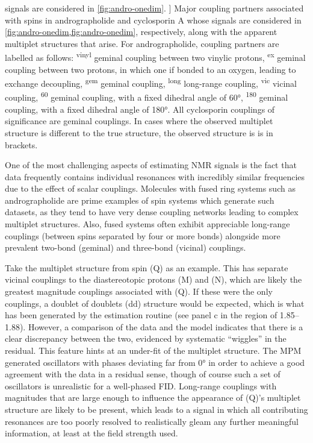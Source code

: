 \begin{table}
    signals are considered in \cref{fig:andro-onedim}.
]{
    Major coupling partners associated with spins in andrographolide and
    cyclosporin A whose
    signals are considered in \cref{fig:andro-onedim,fig:andro-onedim},
    respectively, along with the
    apparent multiplet structures that arise.
    For andrographolide,
    coupling partners are labelled as follows:
    \textsuperscript{vinyl} geminal coupling between two vinylic protons,
    \textsuperscript{ex} geminal coupling between two protons, in which one
    if bonded to an oxygen, leading to exchange decoupling,
    \textsuperscript{gem} geminal coupling,
    \textsuperscript{long} long-range coupling,
    \textsuperscript{vic} vicinal coupling,
    \textsuperscript{60} geminal coupling, with a fixed dihedral angle of \ang{60},
    \textsuperscript{180} geminal coupling, with a fixed dihedral angle of \ang{180}.
    All cyclosporin couplings of significance are geminal couplings.
    In cases where the observed multiplet structure is different to the true
    structure, the observed structure is is in brackets.
}
\label{tab:andro-multiplets}
\end{table}
One of the most challenging aspects of estimating \ac{NMR} signals is
the fact that data frequently contains individual resonances with incredibly
similar frequencies due to the effect of scalar couplings. Molecules
with fused ring systems such as andrographolide are prime examples of spin
systems which generate such datasets, as they tend to have very dense coupling
networks leading to complex multiplet structures. Also, fused systems often
exhibit appreciable long-range couplings (between spins separated by four or more bonds) alongside more prevalent two-bond (geminal) and three-bond (vicinal) couplings.

Take the multiplet structure from spin (Q) as an example.
This has separate vicinal couplings to the
diastereotopic protons (M) and (N), which are likely the greatest magnitude couplings
associated with (Q). If these were the only couplings, a doublet of doublets
(dd) structure would be expected, which is what has been generated by
the estimation routine (see panel c in the region of
\SIrange{1.85}{1.88}{\partspermillion}). However, a comparison of the data and
the model indicates that there is a clear discrepancy between the two,
evidenced by systematic ``wiggles'' in the residual. This feature hints at an
under-fit of the multiplet structure.
The \ac{MPM} generated oscillators with phases deviating far from \ang{0} in
order to achieve a good agreement with the data in a residual sense, though of
course such a set of oscillators is unrealistic for a well-phased \ac{FID}.
Long-range couplings with magnitudes that are large enough to influence the
appearance of (Q)'s multiplet structure are likely to be present, which leads
to a signal in which all contributing resonances are too poorly resolved to
realistically gleam any further meaningful information, at least at the field
strength used.


